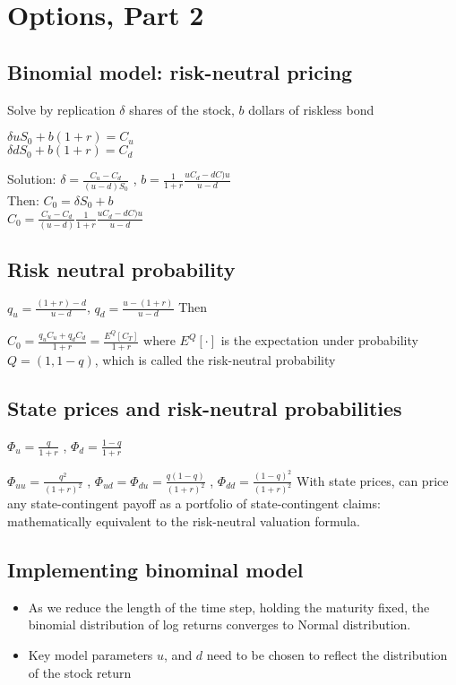 \section{Options, Part 2}

\subsection*{Binomial model: risk-neutral pricing}


Solve by replication $\delta$ shares of the stock, $b$ dollars of riskless bond

$\delta u S_0 + b (1+r) = C_u$ \\
$\delta d S_0 + b (1+r) = C_d$

Solution: $\delta = \frac{C_u-C_d}{(u-d)S_0}$ , 
$b=\frac{1}{1+r}\frac{uC_d-dC)u}{u-d}$ \\
Then: $C_0 = \delta S_0 + b$ \\
$ C_0 = \frac{C_u-C_d}{(u-d)} \frac{1}{1+r} \frac{uC_d-dC)u}{u-d}$ \\

\subsection*{Risk neutral probability}

$q_u=\frac{(1+r)-d}{u-d}$, $q_d = \frac{u-(1+r)}{u-d}$ Then

$C_0=\frac{q_u C_u + q_d C_d}{1+r} = \frac{E^Q[C_T]}{1+r}$ 
where $E^Q[\cdot]$ is the expectation under probability $Q=(1,1-q)$, which is
called the risk-neutral probability

\subsection*{State prices and risk-neutral probabilities}
$\Phi_u = \frac{q}{1+r}$ , $\Phi_d = \frac{1-q}{1+r}$

$\Phi_{uu} = \frac{q^2}{(1+r)^2}$ , $\Phi_{ud} = \Phi_{du} = \frac{q(1-q)}{(1+r)^2}$ , $\Phi_{dd} = \frac{(1-q)^2}{(1+r)^2}$
With state prices, can price any state-contingent payoff as a portfolio of
state-contingent claims: mathematically equivalent to the risk-neutral
valuation formula.


\subsection*{Implementing binominal model}

\begin{itemize}
	\item As we reduce the length of the time step, holding the maturity fixed, the
	binomial distribution of log returns converges to Normal distribution.
	\item Key model parameters $u$, and $d$ need to be chosen to reflect the
	distribution of the stock return
\end{itemize}

